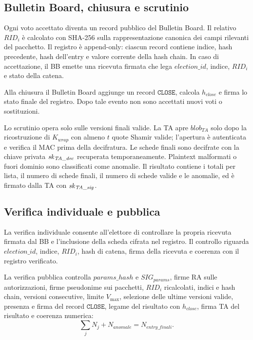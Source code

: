 \subsection{Bulletin Board, chiusura e scrutinio}
\label{wp4:bb-chiusura-scrutinio}

Ogni voto accettato diventa un record pubblico del Bulletin Board. Il relativo $\mathit{RID}_i$ \`e calcolato con SHA-256 sulla rappresentazione canonica dei campi rilevanti del pacchetto. Il registro \`e append-only: ciascun record contiene indice, hash precedente, hash dell'entry e valore corrente della hash chain. In caso di accettazione, il BB emette una ricevuta firmata che lega $\mathit{election\_id}$, indice, $\mathit{RID}_i$ e stato della catena.

Alla chiusura il Bulletin Board aggiunge un record $\texttt{CLOSE}$, calcola $h_{\mathit{close}}$ e firma lo stato finale del registro. Dopo tale evento non sono accettati nuovi voti o sostituzioni.

Lo scrutinio opera solo sulle versioni finali valide. La TA apre $\mathit{blob}_{\mathit{TA}}$ solo dopo la ricostruzione di $K_{\mathit{wrap}}$ con almeno $t$ quote Shamir valide; l'apertura \`e autenticata e verifica il MAC prima della decifratura. Le schede finali sono decifrate con la chiave privata $\mathit{sk}_{\mathit{TA\_dec}}$ recuperata temporaneamente. Plaintext malformati o fuori dominio sono classificati come anomalie. Il risultato contiene i totali per lista, il numero di schede finali, il numero di schede valide e le anomalie, ed \`e firmato dalla TA con $\mathit{sk}_{\mathit{TA\_sig}}$.

\subsection{Verifica individuale e pubblica}
\label{wp4:verifica}

La verifica individuale consente all'elettore di controllare la propria ricevuta firmata dal BB e l'inclusione della scheda cifrata nel registro. Il controllo riguarda $\mathit{election\_id}$, indice, $\mathit{RID}_i$, hash di catena, firma della ricevuta e coerenza con il registro verificato.

La verifica pubblica controlla $\mathit{params\_hash}$ e $\mathit{SIG}_{\mathit{params}}$, firme RA sulle autorizzazioni, firme pseudonime sui pacchetti, $\mathit{RID}_i$ ricalcolati, indici e hash chain, versioni consecutive, limite $V_{\max}$, selezione delle ultime versioni valide, presenza e firma del record $\texttt{CLOSE}$, legame del risultato con $h_{\mathit{close}}$, firma TA del risultato e coerenza numerica:
\[
\sum_j N_j + N_{\mathit{anomale}} = N_{\mathit{entry\_finali}}.
\]


